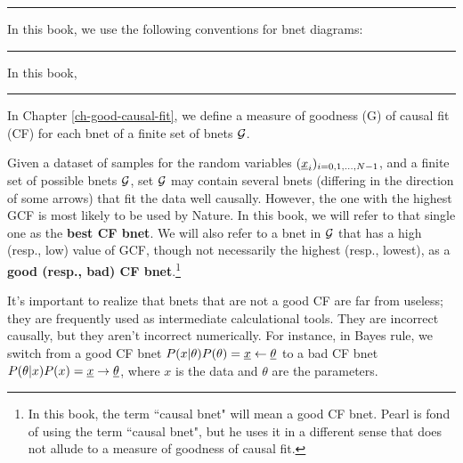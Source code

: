\hrule
In this book,
we use the following conventions
for bnet diagrams:

\bnetInstantiations

\hrule
In this book, \hiddenNodes

\hrule
In  Chapter \ref{ch-good-causal-fit},
we define a measure
of goodness (G) of causal fit (CF)
for each bnet of a finite set of bnets ${\cal G}$.

Given a dataset of samples for
the random variables
$({\underline{x}}_i)_{i=0, 1, \ldots, N-1}$,
and a finite set of possible bnets ${\cal G}$,
set ${\cal G}$ may contain
several bnets (differing
in the direction
of some arrows) that
fit the data well causally. However,
the one with the highest
GCF is most likely to be used
by Nature.
In this book, we will refer to that
single one as the
{\bf best CF bnet}.
We will also refer to
a bnet in ${\cal G}$ that has a high (resp., low) value
of GCF, though not
necessarily the highest (resp., lowest),
as a {\bf good (resp., bad) CF bnet}.\footnote{
In  this book, the term ``causal bnet"
will mean a good CF bnet. Pearl is fond
of using the term ``causal bnet",
but he uses it in a different
sense that does not
allude to a measure of goodness of causal fit.}

It's important to realize
that bnets that are not a good CF
are far from useless; they
are frequently used
as intermediate calculational
tools. They are incorrect causally,
but they aren't incorrect numerically.
For instance, in Bayes rule,
we switch from a good CF bnet
$P(x|\theta)P(\theta)={\underline{x}}\leftarrow\underline{\theta}$
to a bad CF bnet
$P(\theta|x)P(x)={\underline{x}}\rightarrow\underline{\theta}$,
where $x$ is the data
and $\theta$ are the parameters.
